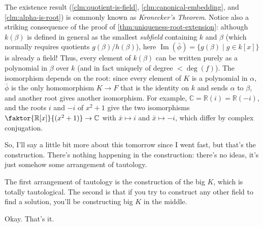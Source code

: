 \begin{aiNote}
The existence result (\cref{clm:quotient-is-field}, \cref{clm:canonical-embedding}, and \cref{clm:alpha-is-root}) is commonly known as \emph{Kronecker's Theorem}. Notice also a striking consequence of the proof of \cref{thm:uniqueness-root-extension}: although $k(\beta)$ is defined in general as the smallest \emph{subfield} containing $k$ and $\beta$ (which normally requires quotients $g(\beta)/h(\beta)$), here $\operatorname{Im}(\bar{\phi}) = \{ g(\beta) \mid g \in k[x] \}$ is already a field! Thus, every element of $k(\beta)$ can be written purely as a polynomial in $\beta$ over $k$ (and in fact uniquely of degree $< \deg(f)$). The isomorphism depends on the root: since every element of $K$ is a polynomial in $\alpha$, $\bar{\phi}$ is the only homomorphism $K \to F$ that is the identity on $k$ and sends $\alpha$ to $\beta$, and another root gives another isomorphism. For example, $\mathbb{C} = \mathbb{R}(i) = \mathbb{R}(-i)$, and the roots $i$ and $-i$ of $x^2 + 1$ give the two isomorphisms $\faktor{\mathbb{R}[x]}{(x^2 + 1)} \to \mathbb{C}$ with $\bar{x} \mapsto i$ and $\bar{x} \mapsto -i$, which differ by complex conjugation.
\end{aiNote}

\begin{speech}[01:31:46 - 01:32:24]
So, I'll say a little bit more about this tomorrow since I went fast, but that's the construction. There's nothing happening in the construction: there's no ideas, it's just somehow some arrangement of tautology.

The first arrangement of tautology is the construction of the big $K$, which is totally tautological. The second is that if you try to construct any other field to find a solution, you'll be constructing big $K$ in the middle.

Okay. That's it.
\end{speech}

